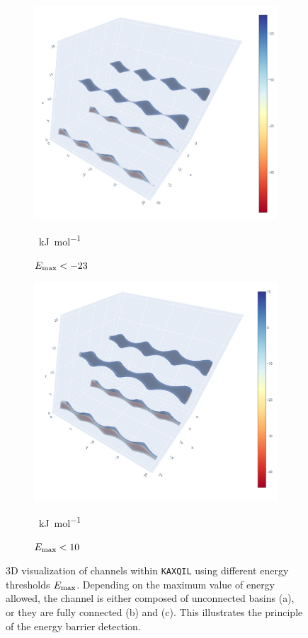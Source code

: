 \documentclass[main]{subfiles}
\begin{document}
\begin{figure}[ht]
\begin{subfigure}[b]{0.32\textwidth}
    \includegraphics[width=\textwidth]{figures/5-diffusion/KAXQIL_23.jpg}
    \caption{$E_{\text{max}}<-23$}~\si{\kJ\per\mole}\label{fgr:KAXQIL_23}
  \end{subfigure}
  \hfill
  \begin{subfigure}[b]{0.32\textwidth}
      \centering
      \includegraphics[width=\textwidth]{figures/5-diffusion/KAXQIL_10.jpg}
      \caption{$E_{\text{max}}<10$}~\si{\kJ\per\mole}\label{fgr:KAXQIL_channel}
  \end{subfigure}
    \caption{ 3D visualization of channels within \texttt{KAXQIL} using different energy thresholds $E_{\text{max}}$. Depending on the maximum value of energy allowed, the channel is either composed of unconnected basins (a), or they are fully connected (b) and (c). This illustrates the principle of the energy barrier detection. }\label{fgr:KAXQIL_channels}
\end{figure}
\end{document}
